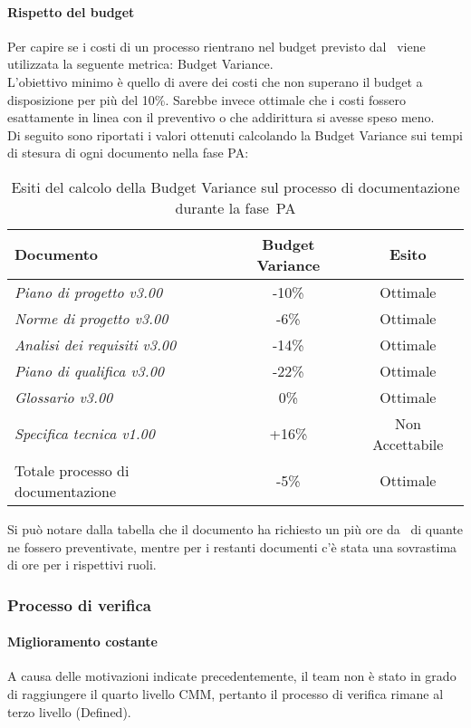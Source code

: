 \documentclass[../PianoDiQualifica.tex]{subfiles}
\begin{document}
\begin{appendices}
			\paragraph{Rispetto del budget}
			Per capire se i costi di un processo rientrano nel budget previsto dal \pianodiprogetto\ viene utilizzata la seguente metrica: Budget Variance.\\
			L'obiettivo minimo è quello di avere dei costi che non superano il budget a disposizione per più del 10\%. Sarebbe invece ottimale che i costi fossero esattamente in linea con il preventivo o che addirittura si avesse speso meno.\\
			Di seguito sono riportati i valori ottenuti calcolando la Budget Variance sui tempi di stesura di ogni documento nella fase PA:
			\begin{table}[H]
				\centering
				\begin{tabular}{l * {2}{c}}
					\toprule
					\textbf{Documento} & \textbf{Budget Variance} & \textbf{Esito} \\
					\midrule
					\textit{Piano di progetto v3.00} & -10\% &  Ottimale \\
					\textit{Norme di progetto v3.00} & -6\% & Ottimale \\
					\textit{Analisi dei requisiti v3.00} & -14\% & Ottimale \\
					\textit{Piano di qualifica v3.00} & -22\% & Ottimale \\
					\textit{Glossario v3.00} & 0\% & Ottimale \\
					\textit{Specifica tecnica v1.00} & +16\% & Non Accettabile \\
					Totale processo di documentazione & -5\% & Ottimale \\
					\bottomrule
				\end{tabular}
				\caption{Esiti del calcolo della Budget Variance sul processo di documentazione durante la fase\g\ PA}
				Si può notare dalla tabella che il documento \specificatecnica ha richiesto un più ore da \progettista\ di quante ne fossero preventivate, mentre per i restanti documenti c'è stata una sovrastima di ore per i rispettivi ruoli.
				\label{tab:esiti_budget_variance}
			\end{table}
			 
						
		\subsubsection{Processo di verifica}
			\paragraph{Miglioramento costante}
			A causa delle motivazioni indicate precedentemente, il team non è stato in grado di raggiungere il quarto livello CMM, pertanto il processo di verifica rimane al terzo livello (Defined).
			

\end{appendices}
\end{document}
